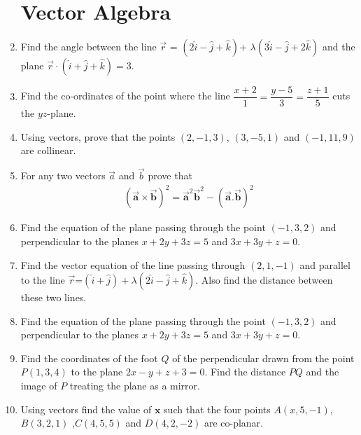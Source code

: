 \documentclass[12pt,-letter paper]{article}
\let\vec\mathbf{}
\let\vec\mathbf{}
\let\vec\mathbf{}
\let\vec\mathbf
\providecommand{\brak}[1]{\ensuremath{\left(#1\right)}}
\begin{document}
\begin{enumerate}
\section{Vector Algebra}

\item  Find the angle between the line $\overrightarrow{r}$ = $\brak{2\hat{i}-\hat{j}+\hat{k}}$+ $\lambda\brak{3\hat{i}-\hat{j}+2\hat{k}}$ and the plane $\overrightarrow{r}\cdot\brak{\hat{i} +\hat{j}+\hat{k}}=3$.

\item Find the co-ordinates of the point where the line $\dfrac{x+2}{1}=\dfrac{y-5}{3}=\dfrac{z+1}{5}$ cuts the $yz$-plane.

\item Using vectors, prove that the points $\brak{2,-1,3}$, $\brak{3,-5,1}$ and $\brak{-1,11,9}$ are collinear.

\item For any two vectors $\overrightarrow{a}$ and $\overrightarrow{b}$  prove that 
	\begin{align*}
	(\overrightarrow{\vec{a}}\times\overrightarrow{\vec{b}})^{2}=\overrightarrow{\vec{a}}^{2}\overrightarrow{\vec{b}}^{2}-(\overrightarrow{\vec{a}}.\overrightarrow{\vec{b}})^{2}
	\end{align*}
 
\item Find the equation of the plane passing through the point $\brak{-1,3,2}$ and perpendicular to the planes $x+2y+3z=5$ and $3x+3y+z=0$.

\item Find the vector equation of the line passing through $\brak{2,1,-1}$ and parallel to the line $\overrightarrow{r}$=$\brak{\hat{i}+\hat{j}}+\lambda\brak{2\hat{i}-\hat{j}+\hat{k}}$. Also find the distance between these two lines.

 \item Find the equation of the plane passing through the point $(-1,3,2)$ and perpendicular to the planes $x+2y+3z=5$ and $3x+3y+z=0$.
 
\item Find the coordinates of the foot $Q$ of the perpendicular drawn from the point $P\brak{1,3,4}$ to the plane $2x-y+z+3=0$. Find the distance $PQ$ and the image of $P$ treating the plane as a mirror. 

\item Using vectors find the value of $\vec{x}$ such that the four points $A\brak{x,5,-1}$, $B\brak{3,2,1}$ ,$C\brak{4,5,5}$ and $D\brak{4,2,-2}$ are co-planar.


\end{enumerate}
\end{document}
